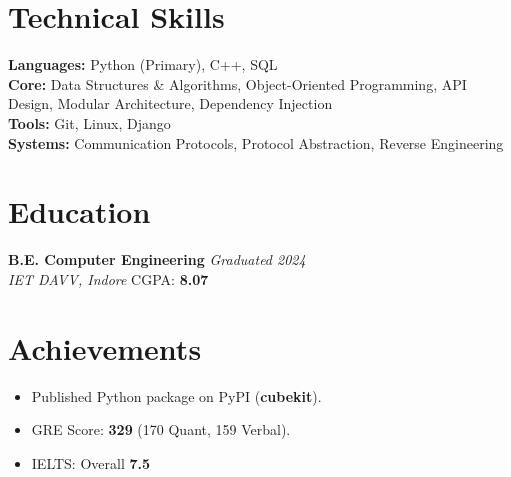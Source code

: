 \documentclass[a4paper,10pt]{article}
\begin{document}
\section*{Technical Skills}

\textbf{Languages:} Python (Primary), C++, SQL \\
\textbf{Core:} Data Structures \& Algorithms, Object-Oriented Programming, API Design, Modular Architecture, Dependency Injection \\
\textbf{Tools:} Git, Linux, Django \\
\textbf{Systems:} Communication Protocols, Protocol Abstraction, Reverse Engineering

\section*{Education}

\noindent
\textbf{B.E. Computer Engineering} \hfill \textit{Graduated 2024} \\
\textit{IET DAVV, Indore} \hfill CGPA: \textbf{8.07}

\section*{Achievements}

\begin{itemize}

\item Published Python package on PyPI (\textbf{cubekit}).

\item GRE Score: \textbf{329} (170 Quant, 159 Verbal).

\item IELTS: Overall \textbf{7.5}

\end{itemize}
\end{document}
